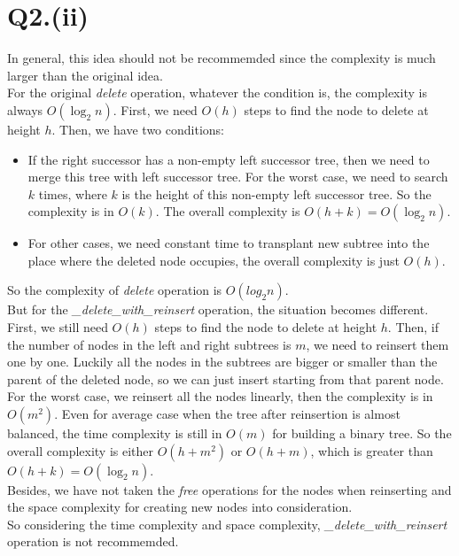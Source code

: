 \documentclass{article}
\begin{document}
\section*{Q2.(ii)}
    In general, this idea should not be recommemded since the complexity is
much larger than the original idea.\\
    For the original \emph{delete} operation, whatever the condition is, the complexity
is always $O(\log_2n)$. First, we need $O(h)$ steps to find the node to delete at 
height $h$. Then, we have two conditions:
\begin{itemize}
    \item If the right successor has a non-empty left successor tree, then we need to
          merge this tree with left successor tree. For the worst case, we need to search
          $k$ times, where $k$ is the height of this non-empty left successor tree. So
          the complexity is in $O(k)$. The overall complexity is $O(h+k) = O(\log_2n)$.
    \item For other cases, we need constant time to transplant new subtree into the place
          where the deleted node occupies, the overall complexity is just $O(h)$.
\end{itemize}
    So the complexity of \emph{delete} operation is $O(log_2n)$.\\

    But for the \emph{\_delete\_with\_reinsert} operation, the situation becomes different.\\
    First, we still need $O(h)$ steps to find the node to delete at height $h$. Then,
if the number of nodes in the left and right subtrees is $m$, we need to reinsert them one 
by one. Luckily all the nodes in the subtrees are bigger or smaller than the parent of
the deleted node, so we can just insert starting from that parent node.\\
    For the worst case, we reinsert all the nodes linearly, then the complexity is in $O(m^2)$.
Even for average case when the tree after reinsertion is almost balanced, the time complexity 
is still in $O(m)$ for building a binary tree. So the overall complexity is either $O(h+m^2)$ 
or $O(h+m)$, which is greater than $O(h+k) = O(\log_2n)$.\\
    Besides, we have not taken the \emph{free} operations for the nodes when reinserting and 
the space complexity for creating new nodes into consideration.\\
    So considering the time complexity and space complexity, \emph{\_delete\_with\_reinsert} 
operation is not recommemded.
\end{document}
